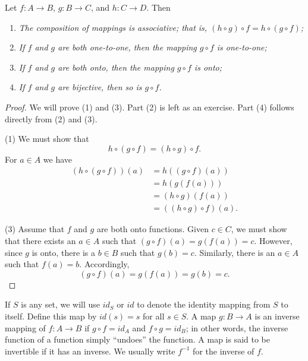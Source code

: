 \begin{theorem}\label{sets_theorem_mapping_properties}
Let $f : A \rightarrow B$, $g : B \rightarrow C$, and $h : C \rightarrow D$. Then  
\begin{enumerate}
 
\rm\item\it
The composition of mappings is associative; that is, $(h \circ g) \circ f = h \circ (g \circ f)$;  
 
\rm\item\it
If $f$ and $g$ are both one-to-one, then the mapping $g \circ f$ is one-to-one; 
 
\rm\item\it
If $f$ and $g$ are both onto, then the mapping $g \circ f$ is onto;  
 
\rm\item\it
If $f$ and $g$ are bijective, then so is $g \circ f$.
 
\end{enumerate}
\end{theorem}
 
\begin{proof}
We will prove (1) and (3). Part (2) is left as an exercise.  Part (4) follows directly from (2) and (3). 
 
(1) 
We must show that
\[
h \circ (g \circ f) = (h \circ g) \circ f.
\]
For $a \in A$ we have
\begin{align*}
(h \circ (g \circ f))(a) & = h((g \circ f)(a)) \\
& = h(g(f(a)))  \\
& = (h \circ g)(f(a)) \\
& = ((h \circ g) \circ f)(a).
\end{align*}
 
(3) 
Assume that $f$ and $g$ are both onto functions.  Given $c \in C$, we must show that there exists an $a \in A$ such that $(g \circ f)(a) = g(f(a)) = c$.  However, since $g$ is onto, there is a $b \in B$ such that $g(b) = c$.  Similarly, there is an $a \in A$ such that $f(a) = b$.  Accordingly, 
\[
(g \circ f)(a) = g(f(a)) = g(b) = c.
\]
\end{proof}
 
\medskip
 
If $S$ is any set, we will use $id_S$ or $id$\label{sets_identity} to denote the {\bfi identity mapping\/} from $S$ to itself.  Define this map by $id(s) = s$ for all $s \in S$.  A map $g: B \rightarrow A$ is an {\bfi inverse mapping\/} of $f: A \rightarrow B$ if $g \circ f = id_A$ and $f \circ g = id_B$; in other words, the inverse function of a function simply ``undoes'' the function.   A map is said to be {\bfi invertible\/} if it has an inverse.  We usually write $f^{-1}$ for the inverse of $f$.  

